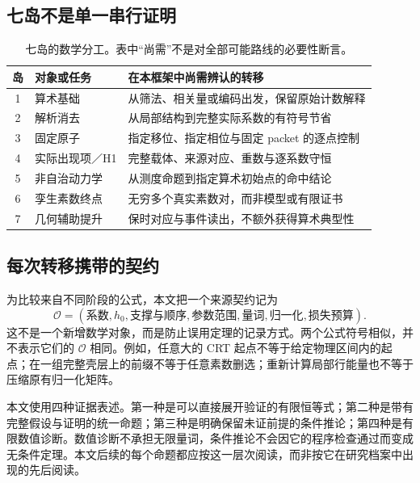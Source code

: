 \subsection{七岛不是单一串行证明}
\begin{table}[ht]
\centering\small
\caption{七岛的数学分工。表中“尚需”不是对全部可能路线的必要性断言。}
\begin{tabularx}{\textwidth}{c l X}
\toprule
岛 & 对象或任务 & 在本框架中尚需辨认的转移\\
\midrule
1 & 算术基础 & 从筛法、相关量或编码出发，保留原始计数解释\\
2 & 解析消去 & 从局部结构到完整实际系数的有符号节省\\
3 & 固定原子 & 指定移位、指定相位与固定 packet 的逐点控制\\
4 & 实际出现项／H1 & 完整载体、来源对应、重数与逐系数守恒\\
5 & 非自治动力学 & 从测度命题到指定算术初始点的命中结论\\
6 & 孪生素数终点 & 无穷多个真实素数对，而非模型或有限证书\\
7 & 几何辅助提升 & 保时对应与事件读出，不额外获得算术典型性\\
\bottomrule
\end{tabularx}
\end{table}

\subsection{每次转移携带的契约}
为比较来自不同阶段的公式，本文把一个来源契约记为
\[
\mathcal O=(\text{系数},h_0,\text{支撑与顺序},\text{参数范围},
\text{量词},\text{归一化},\text{损失预算}).
\]
这不是一个新增数学对象，而是防止误用定理的记录方式。两个公式符号相似，并不表示它们的 $\mathcal O$ 相同。例如，任意大的 CRT 起点不等于给定物理区间内的起点；在一组完整壳层上的前缀不等于任意素数删选；重新计算局部行能量也不等于压缩原有归一化矩阵。

本文使用四种证据表述。第一种是可以直接展开验证的有限恒等式；第二种是带有完整假设与证明的统一命题；第三种是明确保留未证前提的条件推论；第四种是有限数值诊断。数值诊断不承担无限量词，条件推论不会因它的程序检查通过而变成无条件定理。本文后续的每个命题都应按这一层次阅读，而非按它在研究档案中出现的先后阅读。
